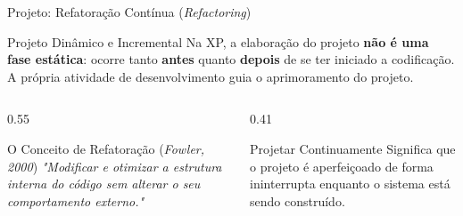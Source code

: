 \documentclass[aspectratio=169, 9pt]{beamer}
\begin{document}
\begin{frame}{Projeto: Refatoração Contínua (\textit{Refactoring})}
  \begin{block}{Projeto Dinâmico e Incremental}
    Na XP, a elaboração do projeto \textbf{não é uma fase estática}: ocorre tanto \textbf{antes} quanto \textbf{depois} de se ter iniciado a codificação. A própria atividade de desenvolvimento guia o aprimoramento do projeto.
  \end{block}

  \vspace{0.3cm}

  \begin{columns}[T]
    \begin{column}{0.55\textwidth}
      \begin{exampleblock}{O Conceito de Refatoração (\textit{Fowler, 2000})}
        \textit{"Modificar e otimizar a estrutura interna do código sem alterar o seu comportamento externo."}
      \end{exampleblock}
    \end{column}

    \begin{column}{0.41\textwidth}
      \begin{alertblock}{Projetar Continuamente}
        Significa que o projeto é aperfeiçoado de forma ininterrupta enquanto o sistema está sendo construído.
      \end{alertblock}
    \end{column}
  \end{columns}
\end{frame}
\end{document}
